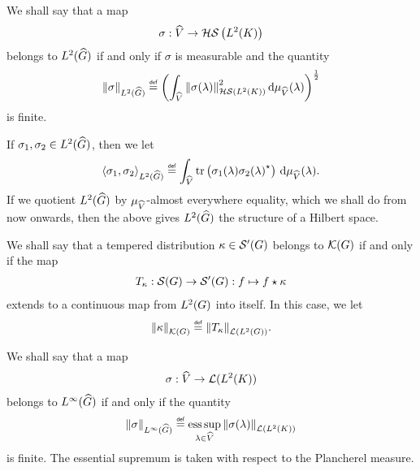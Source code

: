 \begin{definition}
    We shall say that a map
    \begin{align*}
        \sigma : {\widehat{V}} \to {\mathcal{HS} \left({L^{2} (K)}\right)}
    \end{align*}
    belongs to ${L^{2} ({\widehat{G}})}$ if and only if $\sigma$ is measurable and the quantity
    \begin{align*}
        \norm[\LebesgueDual{2}{\Group}]{\sigma} \defeq
            \left(
                \int_\dualGroup{\VectorSpace}
                    \norm[\HilbertSchmidt{\Lebesgue{2}{\CompactGroup}}]{\sigma(\lambda)}^2
                \dd \Plancherel{\VectorSpace}(\lambda)
            \right)^{\frac{1}{2}}
    \end{align*}
    is finite.

    If $\sigma_1, \sigma_2 \in {L^{2} ({\widehat{G}})}$, then we let
    \begin{align*}
        \ip[\LebesgueDual{2}{\Group}]{\sigma_1}{\sigma_2} \defeq
        \int_\dualGroup{\VectorSpace}
            \tr\left(
                \sigma_1(\lambda) \adj{\sigma_2(\lambda)}
            \right)
        \dd \Plancherel{\VectorSpace}(\lambda).
    \end{align*}
    If we quotient ${L^{2} ({\widehat{G}})}$ by $\mu_{{\widehat{V}}}$-almost everywhere equality,
    which we shall do from now onwards,
    then the above gives ${L^{2} ({\widehat{G}})}$ the structure of a Hilbert space.
\end{definition}

\begin{definition}[$\Kernels{\Group}$]
    We shall say that a tempered distribution $\kappa \in {\mathcal{S}' (G)}$ belongs to $\Kernels{\Group}$
    if and only if the map
    \begin{align}
        T_\kappa : {\mathcal{S} (G)} \to {\mathcal{S}' (G)} : f \mapsto f \star \kappa
    \end{align}
    extends to a continuous map from ${L^{2} (G)}$ into itself.
    In this case, we let
    \begin{align*}
        \norm[\Kernels{\Group}]{\kappa} \defeq \norm[\Lin{\Lebesgue{2}{\Group}}]{T_\kappa}.
    \end{align*}
\end{definition}

\begin{definition}
    We shall say that a map
    \begin{align*}
        \sigma : {\widehat{V}} \to {\mathcal{L} ({L^{2} (K)})}
    \end{align*}
    belongs to ${L^{\infty} ({\widehat{G}})}$ if and only if the quantity
    \begin{align*}
        \norm[\LebesgueDual{\infty}{\Group}]{\sigma} \defeq
            \esssup_{\lambda \in \dualGroup{\VectorSpace}}
                \norm[\Lin{\Lebesgue{2}{\CompactGroup}}]{\sigma(\lambda)}
    \end{align*}
    is finite.
    The essential supremum is taken with respect to the Plancherel measure.
\end{definition}

